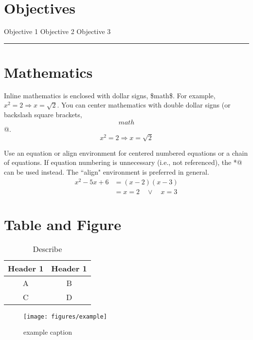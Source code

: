 
\section*{Objectives}
\begin{outline}
    \1 Objective 1
    \1 Objective 2
    \1 Objective 3
\end{outline}

\rule[0.0051in]{\textwidth}{0.00025in}


\section{Mathematics}
Inline mathematics is enclosed with dollar signs, \$math\$.  For example, $x^2 = 2 \Rightarrow x = \sqrt{2}$.  
You can center mathematics with double dollar signs (or backslash square brackets, \verb@\[ math \]@.
\[
x^2 = 2 \Rightarrow x = \sqrt{2}
\]

Use an equation or align environment for centered numbered equations or a chain of equations.
If equation numbering is unnecessary (i.e., not referenced), the \verb@align*@ can be used instead.
The ``align" environment is preferred in general. 
%
\begin{align}
x^2 - 5x + 6 	&= (x - 2)(x - 3) \\
		&= x = 2 \quad \lor \quad x = 3
\end{align}
%



\section{Table and Figure}

\begin{table}[h!]
    \centering
    \begin{tabular}{c c}
     \toprule
    Header 1 &   Header 1 \\
      \midrule
  	A & B\\
	C & D\\
	\bottomrule
    \end{tabular}
    \caption{Describe}
    \label{tab:abc}
\end{table}
%
%
\begin{figure}[htbp] %
   \centering
   \texttt{[image: figures/example]} 
   \caption{example caption}
   \label{fig:example}
\end{figure}

